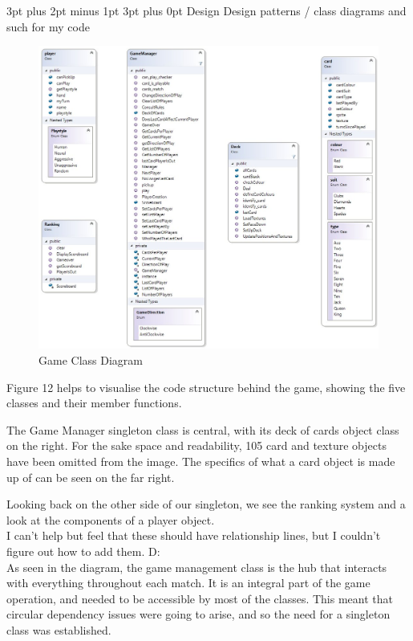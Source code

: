 \documentclass[12pt,a4paper]{article}
\makeatletter
\renewcommand\subsection{\@startsection {subsection}{1}{2mm} %
                               {3pt plus 2pt minus 1pt} %
                               {3pt plus 0pt} %
                               {\normalfont\bfseries}}
\makeatother
\begin{document}
\subsection{Design}
Design patterns / class diagrams and such for my code

\begin{figure}[h]
	\centering
	\includegraphics[width = \textwidth]{ClassDiagram.jpg}
	\caption{Game Class Diagram}
\end{figure}

Figure 12 helps to visualise the code structure behind the game, showing the five classes and their member functions. 

The Game Manager singleton class is central, with its deck of cards object class on the right. For the sake space and readability, 105 card and texture objects have been omitted from the image. The specifics of what a card object is made up of can be seen on the far right.

Looking back on the other side of our singleton, we see the ranking system and a look at the components of a player object. \\

I can't help but feel that these should have relationship lines, but I couldn't figure out how to add them. D: \\


As seen in the diagram, the game management class is the hub that interacts with everything throughout each match. It is an integral part of the game operation, and needed to be accessible by most of the classes. This meant that circular dependency issues were going to arise, and so the need for a singleton class was established. 
\end{document}
